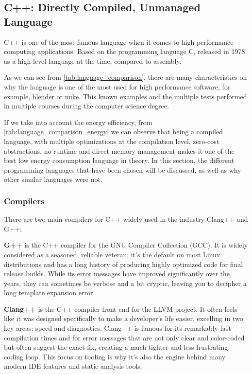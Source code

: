 \subsection{C++: Directly Compiled, Unmanaged Language}
C++ is one of the most famous language when it comes to high performance computing applications. Based on the programming language C, released in 1978 as a high-level language at the time, compared to assembly.


As we can see from \autoref{tab:language_comparison}, there are many characteristics on why the language is one of the most used for high performance software, for example, \href{https://blender.org}{blender} or \href{https://www.foundry.com/products/nuke-family}{nuke}. This known examples and the multiple tests performed in multiple courses during the computer science degree.

If we take into account the energy efficiency, from \autoref{tab:language_comparison_energy} we can observe that being a compiled language, with multiple optimizations at the compilation level, zero-cost abstractions, no runtime and direct memory management makes it one of the best low energy consumption language in theory.
In this section, the different programming languages that have been chosen will be discussed, as well as why other similar languages were not.

\subsubsection{Compilers}

There are two main compilers for C++ widely used in the industry Clang++ and G++:

\textbf{G++} is the C++ compiler for the GNU Compiler Collection (GCC). It is widely considered as a seasoned, reliable veteran; it's the default on most Linux distributions and has a long history of producing highly optimized code for final release builds. While its error messages have improved significantly over the years, they can sometimes be verbose and a bit cryptic, leaving you to decipher a long template expansion error.

\textbf{Clang++} is the C++ compiler front-end for the \gls{LLVM} project. It often feels like it was designed specifically to make a developer's life easier, excelling in two key areas: speed and diagnostics. Clang++ is famous for its remarkably fast compilation times and for error messages that are not only clear and color-coded but often suggest the exact fix, creating a much tighter and less frustrating coding loop. This focus on tooling is why it's also the engine behind many modern IDE features and static analysis tools.


